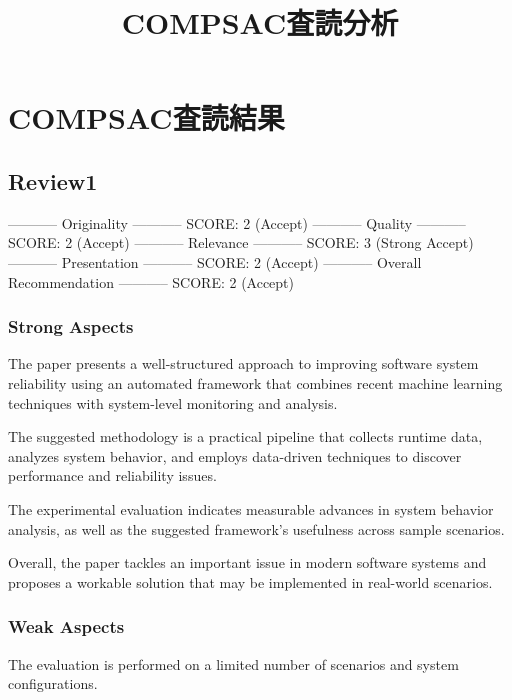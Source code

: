 \documentclass[conference,15pt]{IEEEtran}
\begin{document}
\title{COMPSAC査読分析}

\author{
}

\maketitle




\section*{COMPSAC査読結果}
\label{sec:org6f4fca6}
\subsection*{Review1}
\label{sec:orgf5974de}
----------- Originality -----------
SCORE: 2 (Accept)
----------- Quality -----------
SCORE: 2 (Accept)
----------- Relevance -----------
SCORE: 3 (Strong Accept)
----------- Presentation -----------
SCORE: 2 (Accept)
----------- Overall Recommendation -----------
SCORE: 2 (Accept)


\subsubsection*{Strong Aspects}
\label{sec:orge2fc8ce}
The paper presents a well-structured approach to improving software
system reliability using an automated framework that combines recent
machine learning techniques with system-level monitoring and analysis.

The suggested methodology is a practical pipeline that
collects runtime data, analyzes system behavior, and employs
data-driven techniques to discover performance and reliability
issues.

The experimental evaluation indicates measurable advances in
system behavior analysis, as well as the suggested framework's
usefulness across sample scenarios.

Overall, the paper tackles an important issue in modern software
systems and proposes a workable solution that may be implemented in
real-world scenarios.

\subsubsection*{Weak Aspects}
\label{sec:orgc1dcd98}
The evaluation is performed on a limited number of scenarios and system configurations.
\end{document}
